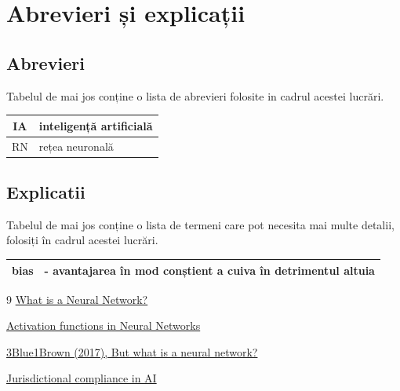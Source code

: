 \documentclass{article}
\begin{document}
\section{Abrevieri și explicații}
\subsection{Abrevieri}

Tabelul de mai jos conține o lista de abrevieri folosite in cadrul acestei lucrări. \newline


\begin{tabular}{ | c | l | } %
\hline %
IA & inteligență artificială \\ 
\hline
RN & rețea neuronală  \\
\hline
\end{tabular}

\subsection{Explicatii}

Tabelul de mai jos conține o lista de termeni care pot necesita mai multe detalii, folosiți în cadrul acestei lucrări.\newline


\begin{tabular}{ | c | l | } %
\hline
bias & - avantajarea în mod conștient a cuiva în detrimentul altuia \\ %
\hline %
\end{tabular}


\newpage


\begin{thebibliography}{9}
\href{https://www.geeksforgeeks.org/machine-learning/neural-networks-a-beginners-guide/}{What is a Neural Network?}

\href{https://www.geeksforgeeks.org/machine-learning/activation-functions-neural-networks/}{Activation functions in Neural Networks}

\href{https://www.youtube.com/watch?v=aircAruvnKk}{3Blue1Brown (2017), But what is a neural network?}

\href{https://verifywise.ai/lexicon/jurisdictional-compliance-in-ai}{Jurisdictional compliance in AI}

\end{thebibliography}
\end{document}
